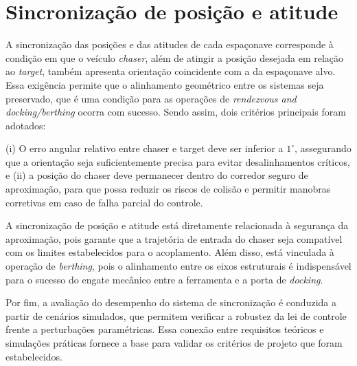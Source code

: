\section{Sincronização de posição e atitude}
\label{sec:sincronizacao}
A sincronização das posições e das atitudes de cada espaçonave corresponde à condição em que o veículo \emph{chaser}, além de atingir a posição desejada em relação ao \emph{target}, também apresenta orientação coincidente com a da espaçonave alvo.
Essa exigência permite que o alinhamento geométrico entre os sistemas seja preservado, que é uma condição para as operações de \emph{rendezvous and docking/berthing} ocorra com sucesso.
Sendo assim, dois critérios principais foram adotados:

(i) O erro angular relativo entre chaser e target deve ser inferior a $1^\circ$, assegurando que a orientação seja suficientemente precisa para evitar desalinhamentos críticos,
e (ii) a posição do chaser deve permanecer dentro do corredor seguro de aproximação, para que possa reduzir os riscos de colisão e permitir manobras corretivas em caso de falha parcial do controle.

A sincronização de posição e atitude está diretamente relacionada à segurança da aproximação, pois garante que a trajetória de entrada do chaser seja compatível com os limites estabelecidos para o acoplamento.
Além disso, está vinculada à operação de \emph{berthing}, pois o alinhamento entre os eixos estruturais é indispensável para o sucesso do engate mecânico entre a ferramenta e a porta de \emph{docking}.

Por fim, a avaliação do desempenho do sistema de sincronização é conduzida a partir de cenários simulados, que permitem verificar a robustez da lei de controle frente a perturbações paramétricas.
Essa conexão entre requisitos teóricos e simulações práticas fornece a base para validar os critérios de projeto que foram estabelecidos.